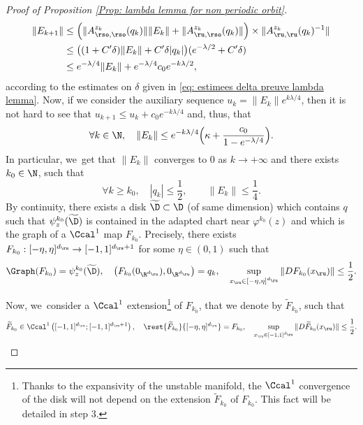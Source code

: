 \begin{appendix}
\begin{proof}[Proof of Proposition \ref{Prop: lambda lemma for non periodic orbit}]
\begin{align*}
\|E_{k+1}\| &\leq \left(\|A_{\rso,\rso}^{z_k} (q_k) \| \|E_k \| + \| A_{\ru,\rso}^{z_k} (q_k) \| \right) \times \| A_{\ru,\ru}^{z_k} (q_k)^{-1}\| \\
&\leq \big((1 + C' \delta) \|E_k \| + C' \delta |q_k| \big) (e^{-\lambda/ 2} + C' \delta) \\
&\leq e^{- \lambda /4} \|E_k \| + e^{- \lambda /4 } c_0 e^{-k \lambda/ 2},
\end{align*}
according to the estimates on $\delta$ given in \eqref{eq: estimees delta preuve lambda lemma}.
Now, if we consider the auxiliary sequence $u_k = \| E_k \| e^{k \lambda / 4}$, then it is not hard to see that $u_{k + 1} \leq u_k + c_0 e^{-k \lambda /4}$ and, thus, that
\[
\forall k \in \N, \quad \|E_k \| \leq e^{- k \lambda /4} \Bigl(\kappa + \frac{c_0}{1 - e^{-\lambda/ 4}} \Bigr).
\]
In particular, we~get that $\|E_k \|$ converges to $0$ as $k \to +\infty$ and there exists $k_{0} \in \N$, such that
\[
\forall k \geq k_0, \quad |q_k| \leq \frac{1}{2}, \qquad \|E_k \| \leq \frac{1}{4}.
\]
By continuity, there exists a disk $\widetilde{\D} \subset \D$ (of same dimension) which contains $q$ such that $\psi_z^{k_0} (\widetilde{\D})$ is contained in the adapted chart near $\varphi^{k_0} (z)$ and which is the graph of a $\Ccal^{1}$ map $F_{k_0}$. Precisely, there exists $F_{k_0}: [-\eta, \eta]^{d_\ru} \to [-1,1]^{d_\rs + 1}$ for some $\eta \in (0, 1)$ such that
\[
\Graph (F_{k_0}) = \psi_z^{k_0} (\widetilde{\D}), \quad \left(F_{k_0} (0_{\R^{d_\ru}}), 0_{\R^{d_\ru}}\right) = q_k, \quad \sup_{x_\ru \in [-\eta, \eta]^{d_\ru}}\|D F_{k_0} (x_\ru) \| \leq \frac{1}{2}.
\]

Now, we~consider a $\Ccal^1$ extension\footnote{Thanks to the expansivity of the unstable manifold, the $\Ccal^1$ convergence of the disk will not depend on the extension $\widetilde{F}_{k_0}$ of $F_{k_0}$. This fact will be detailed in step 3.} of $F_{k_0}$, that we denote by $\widetilde{F}_{k_0}$, such that
\[
\widetilde{F}_{k_0} \in \Ccal^1 \left([-1,1]^{d_\ru}; [-1,1]^{d_\rs + 1} \right), \quad \rest{\widetilde{F}_{k_0}}{[-\eta, \eta]^{d_\ru}}= F_{k_0}, \quad \sup_{x_\ru \in [-1, 1]^{d_\ru}}\|D \widetilde{F}_{k_0} (x_\ru) \| \leq \frac{1}{2}.
\]


\end{proof}
\end{appendix}
